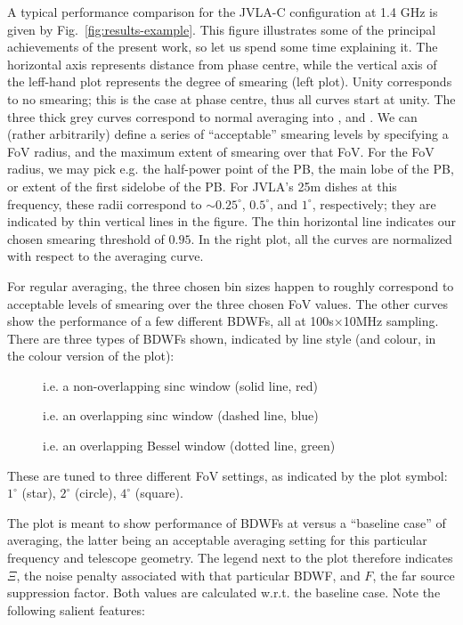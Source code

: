 \documentclass[useAMS,usenatbib]{mn2e}
\begin{document}
A typical performance comparison for the JVLA-C configuration at 1.4 GHz is given by Fig.~\ref{fig:results-example}.
This figure illustrates some of the principal achievements of the present work, so let us spend some time explaining it.
The horizontal axis represents distance from phase centre, while the vertical axis of the leff-hand plot represents  the
degree of smearing (left plot). Unity corresponds to no smearing; this is the case at phase centre, thus all curves
start at unity. The three thick grey curves correspond to normal averaging into ,  and
. We can (rather arbitrarily) define a series of ``acceptable'' smearing levels by specifying a  FoV
radius, and the maximum extent of smearing over that FoV. For the FoV radius, we may pick e.g. the half-power point  of
the PB, the main lobe of the PB, or extent of the first sidelobe of the PB. For JVLA's 25m dishes at this frequency,
these radii correspond to $\sim0.25^\circ$, $0.5^\circ$, and $1^\circ$, respectively; they are indicated by thin
vertical lines in the figure. The thin horizontal line indicates our chosen smearing threshold of $0.95$. In the right
plot,  all the curves are normalized with respect to the  averaging curve.

For regular averaging, the three chosen bin sizes happen to roughly correspond to acceptable levels of smearing over the
three chosen FoV values. The other curves show the performance of a few different BDWFs, all at 100s$\times$10MHz
sampling. There are three types of BDWFs shown, indicated by line style (and colour, in the colour version of the plot):
\begin{description}
\item[] i.e. a non-overlapping sinc window (solid line, red)
\item[] i.e. an overlapping sinc window (dashed line, blue)
\item[] i.e. an overlapping Bessel window (dotted line, green)
\end{description}
These are tuned to three different FoV settings, as indicated by the plot symbol: $1^\circ$ (star), $2^\circ$ (circle),
$4^\circ$ (square). 

The plot is meant to show performance of BDWFs at  versus a ``baseline case'' of  averaging, 
the latter being an acceptable averaging setting for this particular frequency and telescope geometry. The legend 
next to the plot therefore indicates $\Xi$, the noise penalty associated with that particular BDWF, and $F$, the 
far source suppression factor. Both values are calculated w.r.t. the baseline case. Note the following salient features:
\end{document}
